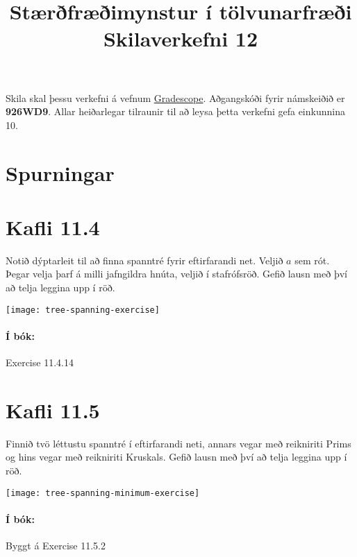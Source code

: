 \documentclass{exam}
\title{Stærðfræðimynstur í tölvunarfræði \\ Skilaverkefni 12}
\author{}
\begin{document}
\maketitle
\thispagestyle{empty} 

Skila skal þessu verkefni á vefnum \href{https://gradescope.com/}{Gradescope}. Aðgangskóði fyrir námskeiðið er \textbf{926WD9}. Allar heiðarlegar tilraunir til að leysa þetta verkefni gefa einkunnina 10.

\section{Spurningar}

\begin{questions}

\section{Kafli 11.4}

\question Notið dýptarleit til að finna spanntré fyrir eftirfarandi net. Veljið $a$ sem rót. Þegar velja þarf á milli jafngildra hnúta, veljið í stafrófsröð. Gefið lausn með því að telja leggina upp í röð.

\begin{center}
\texttt{[image: tree-spanning-exercise]}
\end{center}

\paragraph{Í bók:} Exercise 11.4.14

\section{Kafli 11.5}

\question Finnið tvö léttustu spanntré í eftirfarandi neti, annars vegar með reikniriti Prims og hins vegar með reikniriti Kruskals. Gefið lausn með því að telja leggina upp í röð.

\begin{center}
\texttt{[image: tree-spanning-minimum-exercise]}
\end{center}

\paragraph{Í bók:} Byggt á Exercise 11.5.2


\end{questions}
\end{document}
